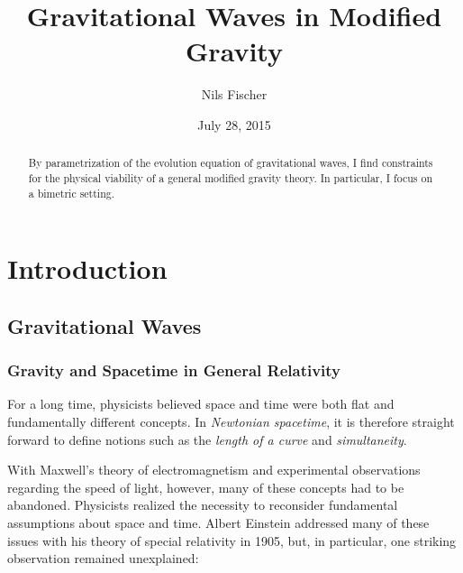 \documentclass[parskip=half]{scrreprt}
\title{Gravitational Waves in Modified Gravity}
\author{Nils Fischer}
\date{July 28, 2015}
\begin{document}


\begin{abstract}
	By parametrization of the evolution equation of gravitational waves, I find constraints for the physical viability of a general modified gravity theory. In particular, I focus on a bimetric setting.
\end{abstract}


\tableofcontents


\chapter{Introduction}\label{ch:intro}


\section{Gravitational Waves}\label{sec:grav_waves}


\subsection{Gravity and Spacetime in General Relativity}\label{sec:gr}

For a long time, physicists believed space and time were both flat and fundamentally different concepts. In \emph{Newtonian spacetime}, it is therefore straight forward to define notions such as the \emph{length of a curve} and \emph{simultaneity}. 

With Maxwell's theory of electromagnetism and experimental observations regarding the speed of light, however, many of these concepts had to be abandoned. Physicists realized the necessity to reconsider fundamental assumptions about space and time. Albert Einstein addressed many of these issues with his theory of special relativity  in 1905, but, in particular, one striking observation remained unexplained:
\end{document}
